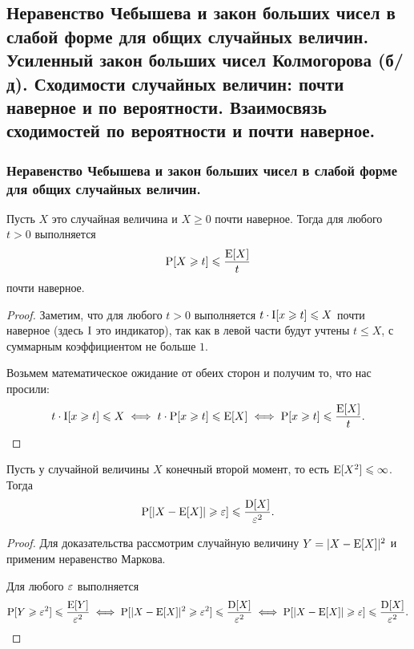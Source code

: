 \subsection{Неравенство Чебышева и закон больших чисел в слабой форме для общих случайных величин. Усиленный закон больших чисел Колмогорова (б/д). Сходимости случайных величин: почти наверное и по вероятности. Взаимосвязь сходимостей по вероятности и почти наверное.}

\subsubsection{Неравенство Чебышева и закон больших чисел в слабой форме для общих случайных величин.}

\begin{theorem*}
    Пусть $X$ это случайная величина и $X \geq 0$ почти наверное. Тогда для любого $t > 0$ выполняется
    \begin{equation*}
        \operatorname{P}[X \geqslant t] \leqslant \dfrac{\operatorname{E}[X]}{t}
    \end{equation*}
    почти наверное.
\end{theorem*}

\begin{proof}
    Заметим, что для любого $t > 0$ выполняется $t \cdot \operatorname{I}[x \geqslant t] \leqslant X$ почти наверное (здесь $\operatorname{I}$ это индикатор), так как в левой части будут учтены $t \leq X$, с суммарным коэффициентом не больше $1$.

    Возьмем математическое ожидание от обеих сторон и получим то, что нас просили:
    \begin{equation*}
        t \cdot \operatorname{I}[x \geqslant t] \leqslant X
        \iff t \cdot \operatorname{P}[x \geqslant t] \leqslant \operatorname{E}[X] 
        \iff \operatorname{P}[x \geqslant t] \leqslant \dfrac{\operatorname{E}[X]}{t}.
    \end{equation*}
\end{proof}

\begin{theorem*}
    Пусть у случайной величины $X$ конечный второй момент, то есть $\operatorname{E}[X^2] \leqslant \infty$. Тогда
    \begin{equation*}
        \operatorname{P}[|X - \operatorname{E}[X]| \geqslant \varepsilon] \leqslant \dfrac{\operatorname{D}[X]}{\varepsilon^2}.
    \end{equation*}
\end{theorem*}

\begin{proof}
    Для доказательства рассмотрим случайную величину $Y = |X - \operatorname{E}[X]|^2$ и применим неравенство Маркова.

    Для любого $\varepsilon$ выполняется
    \begin{equation*}
        \operatorname{P}[Y \geqslant \varepsilon^2] \leqslant \dfrac{\operatorname{E}[Y]}{\varepsilon^2}
        \iff \operatorname{P}[|X - \operatorname{E}[X]|^2 \geqslant \varepsilon^2] \leqslant \dfrac{\operatorname{D}[X]}{\varepsilon^2}
        \iff \operatorname{P}[|X - \operatorname{E}[X]| \geqslant \varepsilon] \leqslant \dfrac{\operatorname{D}[X]}{\varepsilon^2}.
    \end{equation*}
\end{proof}

